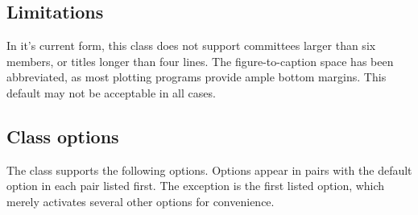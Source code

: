 \subsection{Limitations}\label{limitations}

In it's current form, this class does not support committees larger than
six members, or titles longer than four lines. The figure-to-caption
space has been abbreviated, as most plotting programs provide ample
bottom margins. This default may not be acceptable in all cases.

\subsection{Class options}\label{class-options}

The class supports the following options. Options appear in pairs with
the default option in each pair listed first. The exception is the first
listed option, which merely activates several other options for
convenience.

